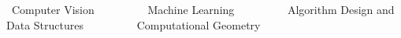 

\begin{cventries}

\bullet\ Computer Vision
\ \ \ \ \ \ \ \ 
\bullet\ Machine Learning
\ \ \ \ \ \ \ \ 
\bullet\ Algorithm Design and Data Structures
\ \ \ \ \ \ \ \  
\bullet\ Computational Geometry

\end{cventries}
